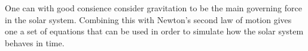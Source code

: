One can with good consience consider gravitation to be the main
governing force in the solar system. Combining this with Newton's
second law of motion gives one a set of equations that can be used
in order to simulate how the solar system behaves in time.
